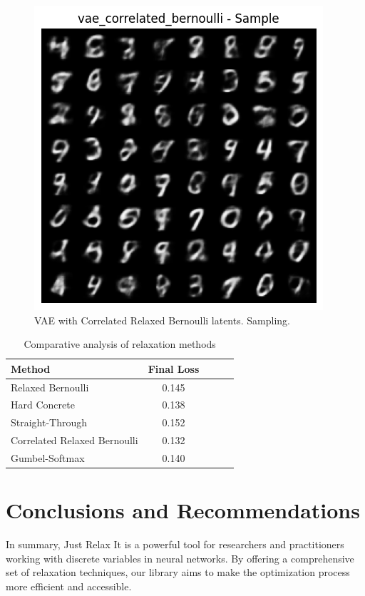\documentclass[peerreview]{IEEEtran}
\begin{document}
\begin{figure}[!h]
\centering
\includegraphics[width=0.8\columnwidth]{vae_correlated_bernoulli_sample.png}
\caption{VAE with Correlated Relaxed Bernoulli latents. Sampling.}
\label{fig_sampling}
\end{figure}

\begin{table}[h]
\centering
\begin{tabular}{l c c c c}
\toprule
Method & Final Loss \\
\midrule
Relaxed Bernoulli &  0.145 \\
Hard Concrete &  0.138 \\
Straight-Through &  0.152 \\
Correlated Relaxed Bernoulli &  0.132 \\
Gumbel-Softmax & 0.140 \\
\bottomrule
\end{tabular}

\vspace{0.5cm} %
\caption{Comparative analysis of relaxation methods}
\label{tab:comparison}
\end{table}

\section{Conclusions and Recommendations}
In summary, Just Relax It is a powerful tool for researchers and practitioners working with discrete variables in neural networks. By offering a comprehensive set of relaxation techniques, our library aims to make the optimization process more efficient and accessible.
\end{document}
